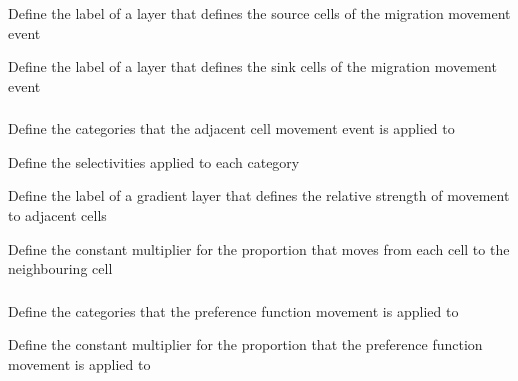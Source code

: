  {Define the label of a layer that defines the source cells of the migration movement event}

 {Define the label of a layer that defines the sink cells of the migration movement event}

\subsubsection[Adjacent cell movement]{}

 {Define the categories that the adjacent cell movement event is applied to}

 {Define the selectivities applied to each category}

 {Define the label of a gradient layer that defines the relative strength of movement to adjacent cells}

 {Define the constant multiplier for the proportion that moves from each cell to the neighbouring cell}

\subsubsection[Preference movement]{}

 {Define the categories that the preference function movement is applied to}

 {Define the constant multiplier for the proportion that the preference function movement is applied to}

